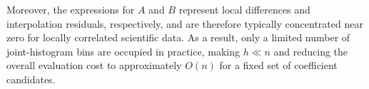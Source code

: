 Moreover, the expressions for $A$ and $B$ represent local differences and interpolation residuals, respectively, and are therefore typically concentrated near zero for locally correlated scientific data. As a result, only a limited number of joint-histogram bins are occupied in practice, making $h\ll n$ and reducing the overall evaluation cost to approximately $O(n)$ for a fixed set of coefficient candidates.
